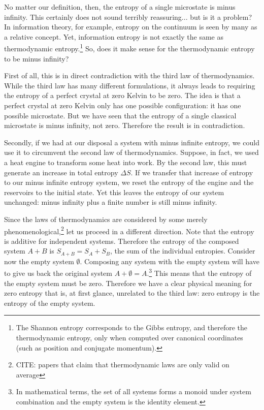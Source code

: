 \documentclass[10pt,twocolumn, nofootinbib]{revtex4-2}
\begin{document}
No matter our definition, then, the entropy of a single microstate is minus infinity. This certainly does not sound terribly reassuring... but is it a problem? In information theory, for example, entropy on the continuum is seen by many as a relative concept. Yet, information entropy is not exactly the same as thermodynamic entropy.\footnote{The Shannon entropy corresponds to the Gibbs entropy, and therefore the thermodynamic entropy, only when computed over canonical coordinates (such as position and conjugate momentum).} So, does it make sense for the thermodynamic entropy to be minus infinity?

First of all, this is in direct contradiction with the third law of thermodynamics. While the third law has many different formulations, it always leads to requiring the entropy of a perfect crystal at zero Kelvin to be zero. The idea is that a perfect crystal at zero Kelvin only has one possible configuration: it has one possible microstate. But we have seen that the entropy of a single classical microstate is minus infinity, not zero. Therefore the result is in contradiction.

Secondly, if we had at our disposal a system with minus infinite entropy, we could use it to circumvent the second law of thermodynamics. Suppose, in fact, we used a heat engine to transform some heat into work. By the second law, this must generate an increase in total entropy $\Delta S$. If we transfer that increase of entropy to our minus infinite entropy system, we reset the entropy of the engine and the reservoirs to the initial state. Yet this leaves the entropy of our system unchanged: minus infinity plus a finite number is still minus infinity.

Since the laws of thermodynamics are considered by some merely phenomenological,\footnote{CITE: papers that claim that thermodynamic laws are only valid on average} let us proceed in a different direction. Note that the entropy is additive for independent systems. Therefore the entropy of the composed system $A+B$ is $S_{A+B} = S_A + S_B$, the sum of the individual entropies. Consider now the empty system $\emptyset$. Composing any system with the empty system will have to give us back the original system $A+\emptyset = A$.\footnote{In mathematical terms, the set of all systems forms a monoid under system combination and the empty system is the identity element.} This means that the entropy of the empty system must be zero. Therefore we have a clear physical meaning for zero entropy that is, at first glance, unrelated to the third law: zero entropy is the entropy of the empty system.
\end{document}
